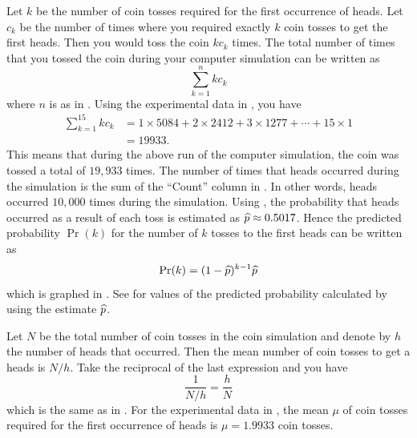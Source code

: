 \documentclass[a4paper,oneside,12pt]{article}
\begin{document}
\begin{problem}
{\begin{solution}
Let $k$ be the number of coin tosses required for the first occurrence
of heads.  Let $c_k$ be the number of times where you required exactly
$k$ coin tosses to get the first heads.  Then you would toss the coin
$k c_k$ times.  The total number of times that you tossed the coin
during your computer simulation can be written as
\[
\sum_{k=1}^n k c_k
\]
where $n$ is as
in .
Using the experimental data in
, you
have
\begin{align*}
\sum_{k=1}^{15} k c_k
&=
1 \times 5084 + 2 \times 2412 + 3 \times 1277 + \cdots
+
15 \times 1 \\[4pt]
&=
19933.
\end{align*}
This means that during the above run of the computer simulation, the
coin was tossed a total of $19,933$ times.  The number of times that
heads occurred during the simulation is the sum of the ``Count''
column in
.  In
other words, heads occurred $10,000$ times during the simulation.
Using , the
probability that heads occurred as a result of each toss is estimated
as $\widehat{p} \approx 0.5017$.  Hence the predicted probability $\Pr(k)$
for the number of $k$ tosses to the first heads can be written as
\begin{equation}
\label{eqn:exponential:coin_simulation_predicted_probability}
\Pr(k)
=
(1 - \widehat{p})^{k-1} \widehat{p}
\end{equation}
which is graphed in
.  See
 for
values of the predicted probability calculated by using the estimate
$\widehat{p}$.

Let $N$ be the total number of coin tosses in the coin simulation and
denote by $h$ the number of heads that occurred.  Then the mean number
of coin tosses to get a heads is $N / h$.  Take the reciprocal of the
last expression and you have
\[
\frac{1}{N / h}
=
\frac{h}{N}
\]
which is the same as in
.  For the
experimental data in
, the
mean $\mu$ of coin tosses required for the first occurrence of heads
is $\mu = 1.9933$ coin tosses.
\end{solution}
}{}
\end{problem}
\end{document}
